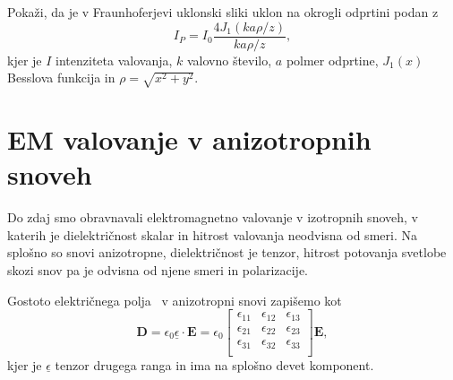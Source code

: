\begin{definition}
\label{naloga-Frauhofer-Kirchhoff-uklon}
Pokaži, da je v Fraunhoferjevi uklonski sliki uklon na okrogli odprtini podan z
\begin{equation}
I_P = I_0\frac{4 J_1(k a \rho/ z)}{k a \rho/z},
\end{equation}
kjer je $I$ intenziteta valovanja, $k$ valovno število, $a$ polmer odprtine, 
$J_1(x)$ Besslova funkcija in $\rho = \sqrt{x^2+y^2}$.
\end{definition}

\section{EM valovanje v anizotropnih snoveh}\label{chap:anizotropni}
Do zdaj smo obravnavali elektromagnetno valovanje
v izotropnih snoveh, v katerih je di\-elek\-tri\-čnost skalar in hitrost 
valovanja neodvisna od smeri. Na splošno so snovi anizotropne,
dielektričnost je tenzor, hitrost potovanja svetlobe 
skozi snov pa je odvisna od njene smeri in polarizacije.

Gostoto električnega polja~ v anizotropni snovi zapišemo kot 
\begin{equation}
\mathbf{D}=\epsilon_{0}\underline{\epsilon} \cdot\mathbf{E} = 
\epsilon_{0}
\left[\begin{array}{ccc}
\epsilon_{11} & \epsilon_{12}& \epsilon_{13}\\
\epsilon_{21} & \epsilon_{22}& \epsilon_{23}\\
\epsilon_{31} & \epsilon_{32}& \epsilon_{33}\\
\end{array}\right]\mathbf{E},
\label{eq:gostota-elektricnega-polja-tenzor}
\end{equation}
kjer je $\underline{\epsilon}$ tenzor drugega ranga in ima na splošno devet komponent.

